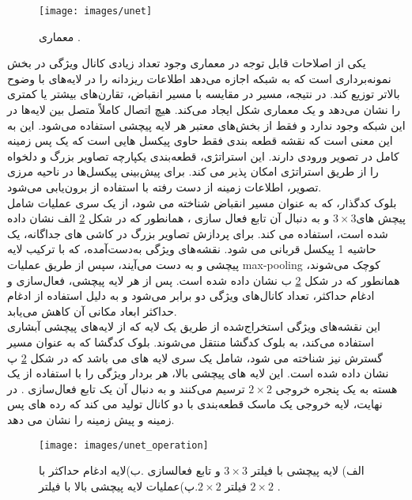 \begin{figure}[h]
\centerline{\texttt{[image: images/unet]}}
\caption[معماری ]{معماری \cite{punn2022modality}.}
\label{fig:unet}
\end{figure}
یکی از اصلاحات قابل توجه در معماری  وجود تعداد زیادی کانال ویژگی در بخش نمونه‌برداری است که به شبکه اجازه می‌دهد اطلاعات ریزدانه را در لایه‌های با وضوح بالاتر توزیع کند. در نتیجه، مسیر  در مقایسه با مسیر انقباض، تقارن‌های بیشتر یا کمتری را نشان می‌دهد و یک معماری  شکل ایجاد می‌کند. هیچ اتصال کاملاً متصل بین لایه‌ها در این شبکه وجود ندارد و فقط از بخش‌های معتبر هر لایه پیچشی استفاده می‌شود. این به این معنی است که نقشه قطعه بندی فقط حاوی پیکسل هایی است که یک پس زمینه کامل در تصویر ورودی دارند. این استراتژی،  قطعه‌بندی یکپارچه تصاویر بزرگ و دلخواه را از طریق استراتژی  امکان پذیر می کند. برای پیش‌بینی پیکسل‌ها در ناحیه مرزی تصویر، اطلاعات زمینه از دست رفته با استفاده از  برون‌یابی می‌شود\cite{walsh2022using}.
\\
بلوک کدگذار، که به عنوان مسیر انقباض شناخته می شود، از یک سری عملیات شامل پیچش های$3\times3$ و به دنبال آن تابع فعال سازی ، همانطور که در شکل \ref{fig:unet_operation} الف نشان داده شده است، استفاده می کند. برای پردازش تصاویر بزرگ در کاشی های جداگانه، یک حاشیه 1 پیکسل قربانی می شود. نقشه‌های ویژگی به‌دست‌آمده، که با ترکیب لایه پیچشی و  به دست می‌آیند، سپس از طریق عملیات max-pooling کوچک می‌شوند، همانطور که در شکل \ref{fig:unet_operation} ب نشان داده شده است. پس از هر لایه پیچشی، فعال‌سازی و ادغام حداکثر، تعداد کانال‌های ویژگی دو برابر می‌شود و به دلیل استفاده از ادغام حداکثر ابعاد مکانی آن کاهش می‌یابد.
\\
این نقشه‌های ویژگی استخراج‌شده از طریق یک لایه  که از لایه‌های پیچشی آبشاری استفاده می‌کند، به بلوک کدگشا منتقل می‌شوند. بلوک کدگشا که به عنوان مسیر گسترش نیز شناخته می شود، شامل یک سری لایه های  می باشد که در شکل \ref{fig:unet_operation} پ  نشان داده شده است. این ‌لایه های پیچشی بالا، هر بردار ویژگی را با استفاده از یک هسته به یک پنجره خروجی $2\times2$ ترسیم می‌کنند و به دنبال آن یک تابع فعال‌سازی . در نهایت، لایه خروجی یک ماسک قطعه‌بندی با دو کانال تولید می کند که رده های پس زمینه و پیش زمینه را نشان می دهد.
\\
\begin{figure}[h]
\centerline{\texttt{[image: images/unet\_operation]}}
\caption[خلاصه ای از عملیات در ]{
    الف) لایه پیچشی با فیلتر $3\times3$ و تابع فعالسازی .ب)لایه ادغام حداکثر با فیلتر $2\times2$.پ)عملیات لایه پیچشی بالا با فیلتر $2\times2$ \cite{punn2022modality}. }
\label{fig:unet_operation}
\end{figure}
